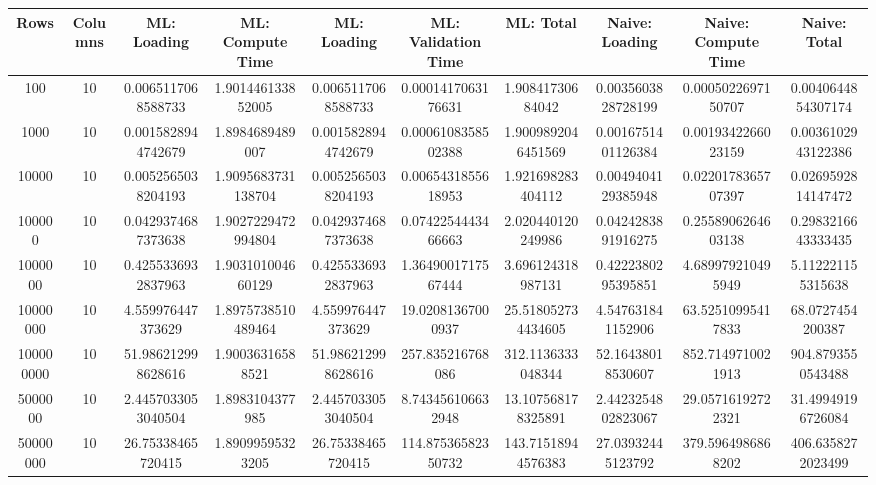 \begin{table}[htb]
    \centering
    \begin{tabular}{@{}cccccccccc@{}}
        \toprule
        Rows & Columns & ML: Loading & ML: Compute Time & ML: Loading & ML: Validation Time & ML: Total & Naive: Loading & Naive: Compute Time & Naive: Total \\
        \midrule
        100 & 10 & 0.0065117068588733 & 1.901446133852005 & 0.0065117068588733 & 0.0001417063176631 & 1.90841730684042 & 0.0035603828728199 & 0.0005022697150707 & 0.0040644854307174 \\
        1000 & 10 & 0.0015828944742679 & 1.8984689489007 & 0.0015828944742679 & 0.0006108358502388 & 1.9009892046451569 & 0.0016751401126384 & 0.0019342266023159 & 0.0036102943122386 \\
        10000 & 10 & 0.0052565038204193 & 1.9095683731138704 & 0.0052565038204193 & 0.0065431855618953 & 1.921698283404112 & 0.0049404129385948 & 0.0220178365707397 & 0.0269592814147472 \\
        100000 & 10 & 0.0429374687373638 & 1.9027229472994804 & 0.0429374687373638 & 0.0742254443466663 & 2.020440120249986 & 0.0424283891916275 & 0.2558906264603138 & 0.2983216643333435 \\
        1000000 & 10 & 0.4255336932837963 & 1.903101004660129 & 0.4255336932837963 & 1.3649001717567444 & 3.696124318987131 & 0.4222380295395851 & 4.689979210495949 & 5.112221155315638 \\
        10000000 & 10 & 4.559976447373629 & 1.8975738510489464 & 4.559976447373629 & 19.02081367000937 & 25.518052734434605 & 4.547631841152906 & 63.52510995417833 & 68.0727454200387 \\
        100000000 & 10 & 51.986212998628616 & 1.90036316588521 & 51.986212998628616 & 257.835216768086 & 312.1136333048344 & 52.16438018530607 & 852.7149710021913 & 904.8793550543488 \\
        5000000 & 10 & 2.4457033053040504 & 1.8983104377985 & 2.4457033053040504 & 8.743456106632948 & 13.107568178325891 & 2.4423254802823067 & 29.05716192722321 & 31.49949196726084 \\
        50000000 & 10 & 26.75338465720415 & 1.89099595323205 & 26.75338465720415 & 114.87536582350732 & 143.71518944576383 & 27.03932445123792 & 379.5964986868202 & 406.6358272023499 \\
        \bottomrule
    \end{tabular}
\end{table}